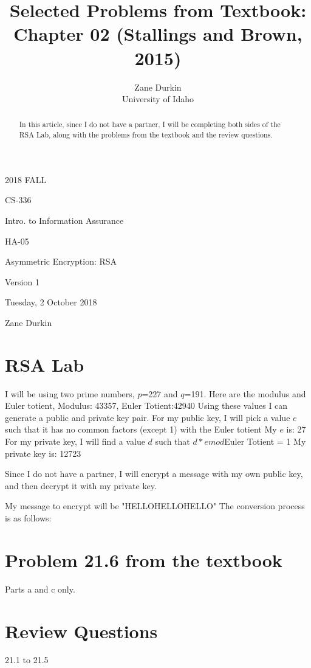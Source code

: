\documentclass[14pt]{article}
\begin{document}
\title{Selected Problems from Textbook: Chapter 02 (Stallings and Brown, 2015)}

\author{Zane Durkin\\
    University of Idaho}
\begin{description}[leftmargin=!, labelwidth=\widthof{\bfseries Author(s) Name(s)}]
\item [Year and Semester] 2018 FALL
\item [Course Number] CS-336
\item [Course Title] Intro. to Information Assurance
\item [Work Number] HA-05
\item [Work Name] Asymmetric Encryption: RSA
\item [Work Version] Version 1
\item [Long Date] Tuesday, 2 October 2018
\item [Author(s) Name(s)] Zane Durkin
\end{description}
\begin{abstract}
In this article, since I do not have a partner, I will be completing both sides of the RSA Lab, along with the problems from the textbook and the review questions.
\end{abstract}

\section{RSA Lab}
I will be using two prime numbers, $p$=227 and $q$=191.
Here are the modulus and Euler totient, Modulus: 43357, Euler Totient:42940
Using these values I can generate a public and private key pair.
For my public key, I will pick a value $e$ such that it has no common factors (except 1) with the Euler totient
My $e$ is: 27
For my private key, I will find a value $d$ such that $d*e mod $Euler Totient = 1
My private key is: 12723

Since I do not have a partner, I will encrypt a message with my own public key, and then decrypt it with my private key.

My message to encrypt will be "HELLOHELLOHELLO"
The conversion process is as follows:


\newpage


\section{Problem 21.6 from the textbook}
Parts a and c only.
\newpage

\section{Review Questions}
21.1 to 21.5

\newpage



\end{document}
